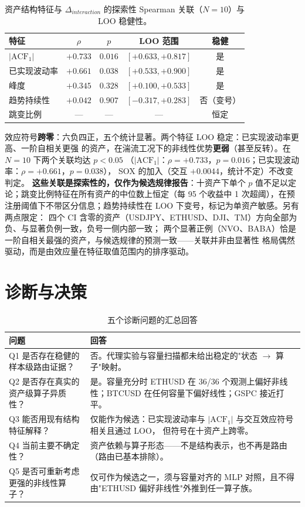 \documentclass[conference]{IEEEtran}
\begin{document}
\begin{table}[!t]
\caption{资产结构特征与 $\Delta_{interaction}$ 的探索性 Spearman 关联（$N=10$）与 LOO 稳健性。}
\label{tab:assoc}
\centering
\small
\begin{tabular}{@{}lcccc@{}}
\toprule
特征 & $\rho$ & $p$ & LOO 范围 & 稳健 \\
\midrule
$|\mathrm{ACF}_1|$  & $+0.733$ & $0.016$ & $[+0.633,+0.817]$ & 是 \\
已实现波动率        & $+0.661$ & $0.038$ & $[+0.533,+0.900]$ & 是 \\
峰度                & $+0.345$ & $0.328$ & $[+0.100,+0.533]$ & 是 \\
趋势持续性          & $+0.042$ & $0.907$ & $[-0.317,+0.283]$ & 否（变号） \\
跳变比例            & ---      & ---     & --- & 恒定 \\
\bottomrule
\end{tabular}
\end{table}

效应符号\textbf{跨零}：六负四正，五个统计显著。两个特征 LOO 稳定：已实现波动率更高、一阶自相关更强
的资产，在湍流工况下的非线性优势\textbf{更弱}（甚至反转）。在 $N=10$ 下两个关联均达 $p<0.05$
（$|\mathrm{ACF}_1|$：$\rho=+0.733$，$p=0.016$；已实现波动率：$\rho=+0.661$，$p=0.038$），
SOX 的加入（交互 $+0.0044$，统计不定）不改变判定。
\textbf{这些关联是探索性的，仅作为候选规律报告}：十资产下单个 $p$ 值不足以定论；跳变比例特征在所有资产的中位数上恒定（每 95 个收益中
1 次超阈），在预注册阈值下不带区分信息；趋势持续性在 LOO 下变号，标记为单资产敏感。另有两点限定：
四个 CI 含零的资产（USDJPY、ETHUSD、DJI、TM）方向全部为负、与显著负例一致，负号一侧内部一致；
两个显著正例（NVO、BABA）恰是一阶自相关最强的资产，与候选规律的预测一致——关联并非由显著性
格局偶然驱动，而是由效应量在特征取值范围内的排序驱动。

\section{诊断与决策}
\begin{table}[!t]
\caption{五个诊断问题的汇总回答}
\label{tab:q}
\centering
\small
\begin{tabular}{@{}p{}p{}@{}}
\toprule
问题 & 回答 \\
\midrule
Q1 是否存在稳健的样本级路由证据？ &
否。代理实验与容量扫描都未给出稳定的"状态 $\rightarrow$ 算子"映射。 \\
Q2 是否存在真实的资产级算子异质性？ &
是。容量充分时 ETHUSD 在 36/36 个观测上偏好非线性；BTCUSD 在任何容量下偏好线性；GSPC 接近打平。 \\
Q3 能否用现有结构特征解释？ &
仅能作为候选：已实现波动率与 $|\mathrm{ACF}_1|$ 与交互效应符号相关且通过 LOO，
但符号在十资产上跨零。 \\
Q4 当前主要不确定性？ &
资产依赖与算子形态——不是结构表示，也不再是路由（路由已基本排除）。 \\
Q5 是否可重新考虑更强的非线性算子？ &
仅可作为候选之一，须与容量对齐的 MLP 对照，且不得由"ETHUSD 偏好非线性"外推到任一算子族。 \\
\bottomrule
\end{tabular}
\end{table}
\end{document}
